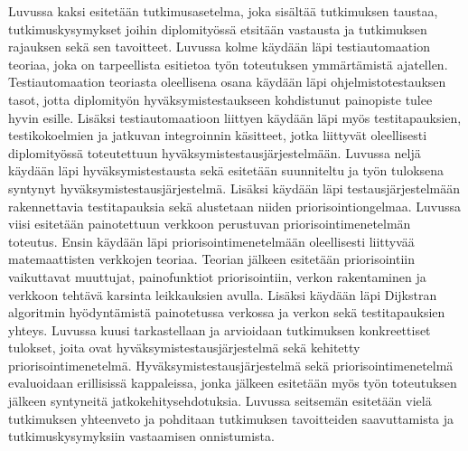 Luvussa kaksi esitetään tutkimusasetelma, joka sisältää tutkimuksen taustaa, tutkimuskysymykset joihin diplomityössä etsitään vastausta ja tutkimuksen rajauksen sekä sen tavoitteet.
Luvussa kolme käydään läpi testiautomaation teoriaa, joka on tarpeellista esitietoa työn toteutuksen ymmärtämistä ajatellen.
Testiautomaation teoriasta oleellisena osana käydään läpi ohjelmistotestauksen tasot, jotta diplomityön hyväksymistestaukseen kohdistunut painopiste tulee hyvin esille.
Lisäksi testiautomaatioon liittyen käydään läpi myös testitapauksien, testikokoelmien ja jatkuvan integroinnin käsitteet, jotka liittyvät oleellisesti diplomityössä toteutettuun hyväksymistestausjärjestelmään.
Luvussa neljä käydään läpi hyväksymistestausta sekä esitetään suunniteltu ja työn tuloksena syntynyt hyväksymistestausjärjestelmä.
Lisäksi käydään läpi testausjärjestelmään rakennettavia testitapauksia sekä alustetaan niiden priorisointiongelmaa.
Luvussa viisi esitetään painotettuun verkkoon perustuvan priorisointimenetelmän toteutus.
Ensin käydään läpi priorisointimenetelmään oleellisesti liittyvää matemaattisten verkkojen teoriaa.
Teorian jälkeen esitetään priorisointiin vaikuttavat muuttujat, painofunktiot priorisointiin, verkon rakentaminen ja verkkoon tehtävä karsinta leikkauksien avulla.
Lisäksi käydään läpi Dijkstran algoritmin hyödyntämistä painotetussa verkossa ja verkon sekä testitapauksien yhteys.
Luvussa kuusi tarkastellaan ja arvioidaan tutkimuksen konkreettiset tulokset, joita ovat hyväksymistestausjärjestelmä sekä kehitetty priorisointimenetelmä.
Hyväksymistestausjärjestelmä sekä priorisointimenetelmä evaluoidaan erillisissä kappaleissa, jonka jälkeen esitetään myös työn toteutuksen jälkeen syntyneitä jatkokehitysehdotuksia.
Luvussa seitsemän esitetään vielä tutkimuksen yhteenveto ja pohditaan tutkimuksen tavoitteiden saavuttamista ja tutkimuskysymyksiin vastaamisen onnistumista.
